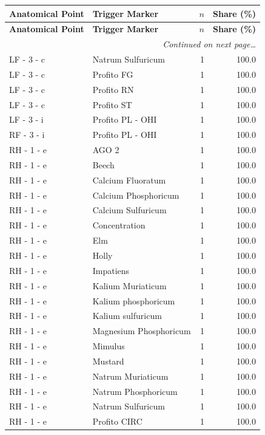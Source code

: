 \documentclass[a4paper,11pt]{article}
\begin{document}
\begin{footnotesize}
\begin{longtable}{p{3.5cm}p{7.5cm}rr}
\toprule
\textbf{Anatomical Point} &
\textbf{Trigger Marker} &
\textbf{$n$} &
\textbf{Share (\%)} \\
\midrule
\endfirsthead
\toprule
\textbf{Anatomical Point} &
\textbf{Trigger Marker} &
\textbf{$n$} &
\textbf{Share (\%)} \\
\midrule
\endhead
\midrule
\multicolumn{4}{r}{\footnotesize\emph{Continued on next page\ldots}} \\
\endfoot
\bottomrule
\endlastfoot
LF - 3 - c & Natrum Sulfuricum & 1 & 100.0 \\
LF - 3 - c & Profito FG & 1 & 100.0 \\
LF - 3 - c & Profito RN & 1 & 100.0 \\
LF - 3 - c & Profito ST & 1 & 100.0 \\
LF - 3 - i & Profito PL - OHI & 1 & 100.0 \\
RF - 3 - i & Profito PL - OHI & 1 & 100.0 \\
RH - 1 - e & AGO 2 & 1 & 100.0 \\
RH - 1 - e & Beech & 1 & 100.0 \\
RH - 1 - e & Calcium Fluoratum & 1 & 100.0 \\
RH - 1 - e & Calcium Phosphoricum & 1 & 100.0 \\
RH - 1 - e & Calcium Sulfuricum & 1 & 100.0 \\
RH - 1 - e & Concentration & 1 & 100.0 \\
RH - 1 - e & Elm & 1 & 100.0 \\
RH - 1 - e & Holly & 1 & 100.0 \\
RH - 1 - e & Impatiens & 1 & 100.0 \\
RH - 1 - e & Kalium Muriaticum & 1 & 100.0 \\
RH - 1 - e & Kalium phosphoricum & 1 & 100.0 \\
RH - 1 - e & Kalium sulfuricum & 1 & 100.0 \\
RH - 1 - e & Magnesium Phosphoricum & 1 & 100.0 \\
RH - 1 - e & Mimulus & 1 & 100.0 \\
RH - 1 - e & Mustard & 1 & 100.0 \\
RH - 1 - e & Natrum Muriaticum & 1 & 100.0 \\
RH - 1 - e & Natrum Phosphoricum & 1 & 100.0 \\
RH - 1 - e & Natrum Sulfuricum & 1 & 100.0 \\
RH - 1 - e & Profito CIRC & 1 & 100.0 \\

\end{longtable}
\end{footnotesize}
\end{document}
